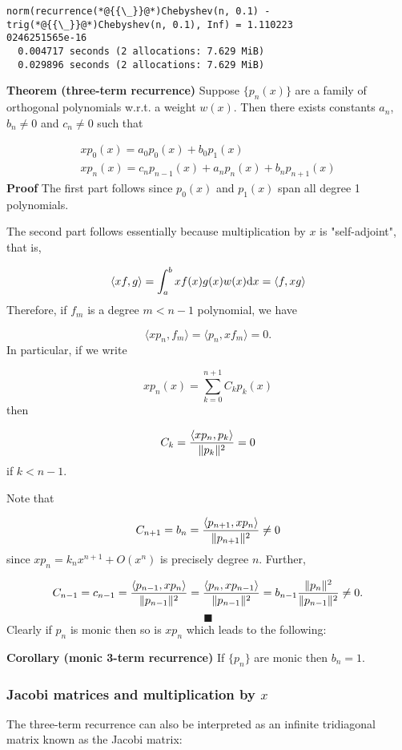 \documentclass[12pt,a4paper]{article}
\begin{document}
\begin{lstlisting}
norm(recurrence(*@{{\_}}@*)Chebyshev(n, 0.1) - trig(*@{{\_}}@*)Chebyshev(n, 0.1), Inf) = 1.110223
0246251565e-16
  0.004717 seconds (2 allocations: 7.629 MiB)
  0.029896 seconds (2 allocations: 7.629 MiB)
\end{lstlisting}


\textbf{Theorem (three-term recurrence)} Suppose $\{p_n(x)\}$ are a family of orthogonal polynomials w.r.t. a weight $w(x)$. Then there exists constants $a_n$, $b_n \neq 0$ and $c_n \neq 0$ such that


\begin{align*}
x p_0(x) = a_0 p_0(x) + b_0 p_1(x) \\
x p_n(x) = c_n p_{n-1}(x) + a_n p_n(x) + b_n p_{n+1}(x)
\end{align*}
\textbf{Proof} The first part follows since $p_0(x)$ and $p_1(x)$ span all degree 1 polynomials.

The second part follows essentially because multiplication by $x$ is "self-adjoint", that is,

\[
\langle x f, g\rangle = \int_a^b x f(x) g(x) w(x) {\rm d}x = \langle f, x g \rangle
\]
Therefore, if $f_m$ is a degree $m < n-1$ polynomial, we have

\[
\langle x p_n, f_m\rangle = \langle p_n, x f_m\rangle = 0.
\]
In particular, if we write

\[
x p_n(x) = \sum_{k=0}^{n+1} C_k p_k(x)
\]
then

\[
C_k = {\langle x p_n, p_k\rangle \over \| p_k\|^2} = 0
\]
if $k < n-1$.

Note that

\[
C_{n+1} = b_n = {\ensuremath{\langle}p_{n+1}, x p_n\ensuremath{\rangle} \over \|p_{n+1} \|^2} \ensuremath{\ne} 0
\]
since $x p_n = k_n x^{n+1} + O(x^n)$ is precisely degree $n$. Further,

\[
C_{n-1} = c_{n-1} = {\ensuremath{\langle}p_{n-1}, x p_n\ensuremath{\rangle} \over \|p_{n-1}\|^2 } =
{\ensuremath{\langle}p_n, x p_{n-1}\ensuremath{\rangle}  \over \|p_{n-1}\|^2 } =  b_{n-1}{\|p_n\|^2  \over \|p_{n-1}\|^2 } \ensuremath{\ne} 0.
\]
\[
\blacksquare
\]
Clearly if $p_n$ is monic then so is $x p_n$ which leads to the following:

\textbf{Corollary (monic 3-term recurrence)} If $\{p_n\}$ are monic then $b_n =  1$.

\subsubsection{Jacobi matrices and multiplication by $x$}
The three-term recurrence can also be interpreted as an infinite tridiagonal matrix known as the Jacobi matrix:
\end{document}
